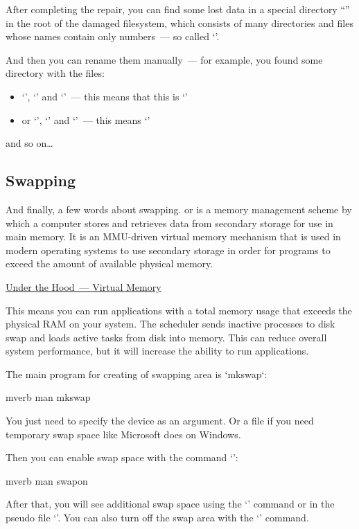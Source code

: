 After completing the repair, you can find some lost data in a special directory
``'' in the root of the damaged filesystem, which consists of
many directories and files whose names contain only numbers~--- so called
`'.

And then you can rename them manually~--- for example, you found some
directory with the files:
\begin{itemize}
\item `', `' and `'~--- this means
      that this is `'
\item or `', `' and `'~--- this means `'
\end{itemize}
and so on\ldots

\subsection*{Swapping} %

And finally, a few words about swapping.  or  
is a memory management scheme by which a computer stores and retrieves data
from secondary storage for use in main memory. It is an MMU-driven virtual
memory mechanism that is used in modern operating systems to use secondary
storage in order for programs to exceed the amount of available physical memory.

\href{under_the_hood/virtual_memory.md}{Under the Hood~--- Virtual Memory}

This means you can run applications with a total memory usage that exceeds
the physical RAM on your system. The scheduler sends inactive processes
to disk swap and loads active tasks from disk into memory. This can reduce
overall system performance, but it will increase the ability to run applications.

The main program for creating of swapping area is `mkswap`:
\begin{code}{mverb}
man mkswap
\end{code}
You just need to specify the device as an argument. Or a file if you need
temporary swap space like Microsoft does on Windows.

Then you can enable swap space with the command `':
\begin{code}{mverb}
man swapon
\end{code}
After that, you will see additional swap space using the `' command or
in the pseudo file `'. You can also turn off the swap area
with the `' command.

